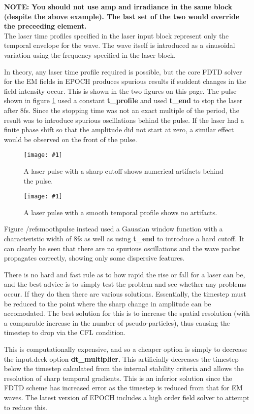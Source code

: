\documentclass[12pt]{article}
\newcommand{\emphtext}{\color{warwickdark} \fontfamily{phv}\selectfont\Large\bf}
\newcommand{\inlineemph}{\color{warwicklight} \bf}
\newcommand{\captionedimage}[3]
  {{\begin{figure}\centering \texttt{[image: \#1]} \caption{#3} \label{#2}
    \end{figure}}}
\begin{document}
{\emphtext NOTE: You should not use amp and irradiance in the same block
(despite the above example). The last set of the two would override the
preceeding element.}\\

The laser time profiles specified in the laser input block represent only the
temporal envelope for the wave. The wave itself is introduced as a sinusoidal
variation using the frequency specified in the laser block.

In theory, any laser time profile required is possible, but the core FDTD
solver for the EM fields in EPOCH produces spurious results if suddent changes
in the field intensity occur. This is shown in the two figures on this
page. The pulse shown in figure \ref{badpulse} used a constant {\inlineemph
t\_profile} and used {\inlineemph t\_end} to stop the laser after 8fs. Since
the stopping time was not an exact multiple of the period, the result was to
introduce spurious oscillations behind the pulse. If the laser had a finite
phase shift so that the amplitude did not start at zero, a similar effect would
be observed on the front of the pulse.

\captionedimage{./images/pulse2.eps}{badpulse}{A laser pulse with a sharp
cutoff shows numerical artifacts behind the pulse.}
\captionedimage{./images/pulse1.eps}{smoothpulse}{A laser pulse with a smooth
temporal profile shows no artifacts.}

Figure /ref{smoothpulse} instead used a Gaussian window function with a
characteristic width of 8fs as well as using {\inlineemph t\_end} to introduce
a hard cutoff. It can clearly be seen that there are no spurious oscillations
and the wave packet propagates correctly, showing only some dispersive
features.

There is no hard and fast rule as to how rapid the rise or fall for a laser can
be, and the best advice is to simply test the problem and see whether any
problems occur. If they do then there are various solutions. Essentially, the
timestep must be reduced to the point where the sharp change in amplitude can
be accomodated. The best solution for this is to increase the spatial
resolution (with a comparable increase in the number of pseudo-particles), thus
causing the timestep to drop via the CFL condition.

This is computationally expensive, and so a cheaper option is simply to
decrease the input.deck option {\inlineemph dt\_multiplier}. This artificially
decreases the timestep below the timestep calculated from the internal
stability criteria and allows the resolution of sharp temporal gradients. This
is an inferior solution since the FDTD scheme has increased error as the
timestep is reduced from that for EM waves. The latest version of EPOCH
includes a high order field solver to attempt to reduce this.
\pagebreak
\end{document}
